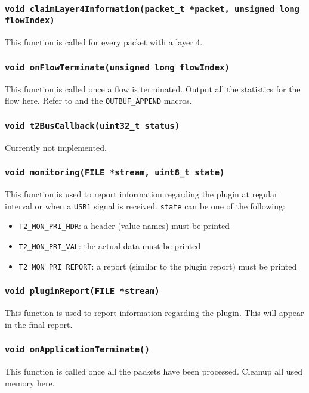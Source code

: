 \documentclass[documentation]{subfiles}
\begin{document}
\subsubsection{\tt void claimLayer4Information(packet\_t *packet, unsigned long flowIndex)}\label{t2cb-claimLayer4Information}
This function is called for every packet with a layer 4.

\subsubsection{\tt void onFlowTerminate(unsigned long flowIndex)}\label{t2cb-onFlowTerminate}
This function is called once a flow is terminated.
Output all the statistics for the flow here.
Refer to  and the {\tt OUTBUF\_APPEND} macros.

\subsubsection{\tt void t2BusCallback(uint32\_t status)}\label{t2cb-t2BusCallback}
Currently not implemented.

\subsubsection{\tt void monitoring(FILE *stream, uint8\_t state)}\label{t2cb-monitoring}
This function is used to report information regarding the plugin at regular interval or when a {\tt USR1} signal is received.
{\tt state} can be one of the following:
\begin{itemize}
    \item {\tt T2\_MON\_PRI\_HDR}: a header (value names) must be printed
    \item {\tt T2\_MON\_PRI\_VAL}: the actual data must be printed
    \item {\tt T2\_MON\_PRI\_REPORT}: a report (similar to the plugin report) must be printed
\end{itemize}

\subsubsection{\tt void pluginReport(FILE *stream)}\label{t2cb-pluginReport}
This function is used to report information regarding the plugin.
This will appear in the final report.

\subsubsection{\tt void onApplicationTerminate()}\label{t2cb-onApplicationTerminate}
This function is called once all the packets have been processed.
Cleanup all used memory here.
\end{document}
